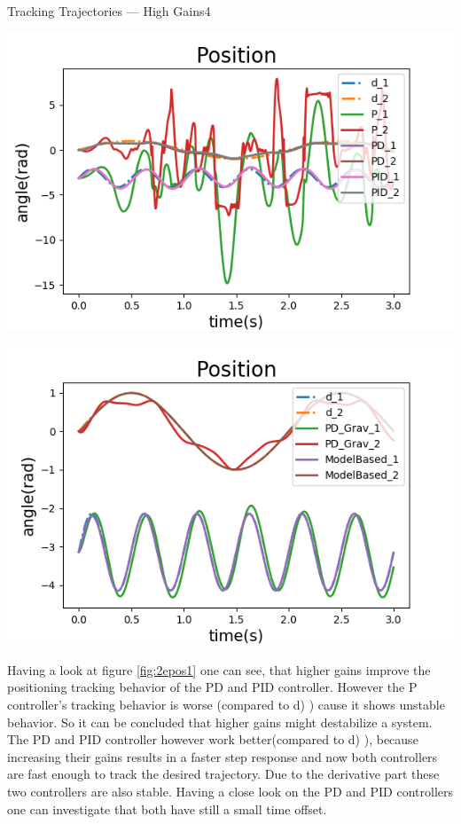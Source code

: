 \begin{questions}
\begin{question}{Tracking Trajectories --- High Gains}{4}
\begin{answer}
					\noindent\begin{minipage}{.5\textwidth}
						\centering
						\includegraphics[width=1\textwidth]{img/2epos1.png} 
						\label{fig:2epos1}            
					\end{minipage}%
					\begin{minipage}{.5\textwidth}
						\centering
						\includegraphics[width=1\textwidth]{img/2epos2.png} 
						\label{fig:2epos2}               
					\end{minipage}
	Having a look at figure \ref{fig:2epos1} one can see, that higher gains improve the positioning tracking behavior of the PD and PID controller. However the P controller's tracking behavior is worse (compared to d) ) cause it shows unstable behavior. So it can be concluded that higher gains might destabilize a system. The PD and PID controller however work better(compared to d) ), because increasing their gains results in a faster step response and now both controllers are fast enough to track the desired trajectory. Due to the derivative part these two controllers are also stable. Having a close look on the PD and PID controllers one can investigate that both have still a small time offset. 
	

\end{answer}
\end{question}
\end{questions}
